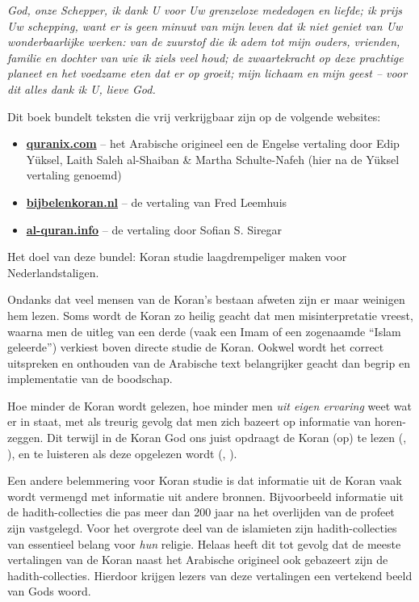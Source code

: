 
\begin{OnehalfSpace}
\emph{God, onze Schepper, ik dank U voor Uw grenzeloze mededogen en liefde; ik prijs Uw schepping, want er is geen minuut van mijn leven dat ik niet geniet van Uw wonderbaarlijke werken: van de zuurstof die ik adem tot mijn ouders, vrienden, familie en dochter van wie ik ziels veel houd; de zwaartekracht op deze prachtige planeet en het voedzame eten dat er op groeit; mijn lichaam en mijn geest -- voor dit alles dank ik U, lieve God.}
\end{OnehalfSpace}
\vspace{1cm}

\noindent Dit boek bundelt teksten die vrij verkrijgbaar zijn op de volgende websites:
\begin{itemize}
  \item \href{http://quranix.com}{\textbf{quranix.com}} -- het Arabische origineel een de Engelse vertaling door Edip Yüksel, Laith Saleh al{-}Shaiban \& Martha Schulte{-}Nafeh (hier na de Yüksel vertaling genoemd)
  \item \href{http://bijbelenkoran.nl}{\textbf{bijbelenkoran.nl}} -- de vertaling van Fred Leemhuis
  \item \href{http://al-quran.info}{\textbf{al-quran.info}} -- de vertaling door Sofian S. Siregar
\end{itemize}
Het doel van deze bundel: Koran studie laagdrempeliger maken voor Nederlandstaligen.
\vspace{0.3cm}

\noindent Ondanks dat veel mensen van de Koran's bestaan afweten zijn er maar weinigen hem lezen.  Soms wordt de Koran zo heilig geacht dat men misinterpretatie vreest, waarna men de uitleg van een derde (vaak een Imam of een zogenaamde ``Islam geleerde'') verkiest boven directe studie de Koran.  Ookwel wordt het correct uitspreken en onthouden van de Arabische text belangrijker geacht dan begrip en implementatie van de boodschap.

Hoe minder de Koran wordt gelezen, hoe minder men \emph{uit eigen ervaring} weet wat er in staat, met als treurig gevolg dat men zich bazeert op informatie van horen-zeggen.  Dit terwijl in de Koran God ons juist opdraagt de Koran (op) te lezen (, ), en te luisteren als deze opgelezen wordt (, ).

Een andere belemmering voor Koran studie is dat informatie uit de Koran vaak wordt vermengd met informatie uit andere bronnen.  Bijvoorbeeld informatie uit de hadith-collecties die pas meer dan 200 jaar na het overlijden van de profeet zijn vastgelegd.  Voor het overgrote deel van de islamieten zijn hadith-collecties van essentieel belang voor \emph{hun} religie.  Helaas heeft dit tot gevolg dat de meeste vertalingen van de Koran naast het Arabische origineel ook gebazeert zijn de hadith-collecties.  Hierdoor krijgen lezers van deze vertalingen een vertekend beeld van Gods woord.


